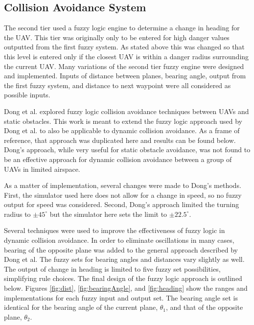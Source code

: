 \documentclass[10pt, conference, compsocconf]{IEEEtran}
\begin{document}
\subsection{Collision Avoidance System}
The second tier used a fuzzy logic engine to determine a change in heading for the UAV. This tier was originally only to be entered for high danger values outputted from the first fuzzy system.  As stated above this was changed so that this level is entered only if the closest UAV is within a danger radius surrounding the current UAV. Many variations of the second tier fuzzy engine were designed and implemented. Inputs of distance between planes, bearing angle, output from the first fuzzy system, and distance to next waypoint were all considered as possible inputs.

Dong et al. explored fuzzy logic collision avoidance techniques between UAVs and static obstacles. This work is meant to extend the fuzzy logic approach used by Dong et al. to also be applicable to dynamic collision avoidance.  As a frame of reference, that approach was duplicated here and results can be found below. Dong's approach, while very useful for static obstacle avoidance, was not found to be an effective approach for dynamic collision avoidance between a group of UAVs in limited airspace.

As a matter of implementation, several changes were made to Dong's methods. First, the simulator used here does not allow for a change in speed, so no fuzzy output for speed was considered. Second, Dong's approach limited the turning radius to $\pm 45^\circ$ but the simulator here sets the limit to $\pm 22.5^\circ$.

Several techniques were used to improve the effectiveness of fuzzy logic in dynamic collision avoidance. In order to eliminate oscillations in many cases, bearing of the opposite plane was added to the general approach described by Dong et al. The fuzzy sets for bearing angles and distances vary slightly as well. The output of change in heading is limited to five fuzzy set possibilities, simplifying rule choices. The final design of the fuzzy logic approach is outlined below. Figures \ref{fig:dist}, \ref{fig:bearingAngle}, and \ref{fig:heading} show the ranges and implementations for each fuzzy input and output set. The bearing angle set is identical for the bearing angle of the current plane, $\theta_1$, and that of the opposite plane, $\theta_2$. 
\end{document}
